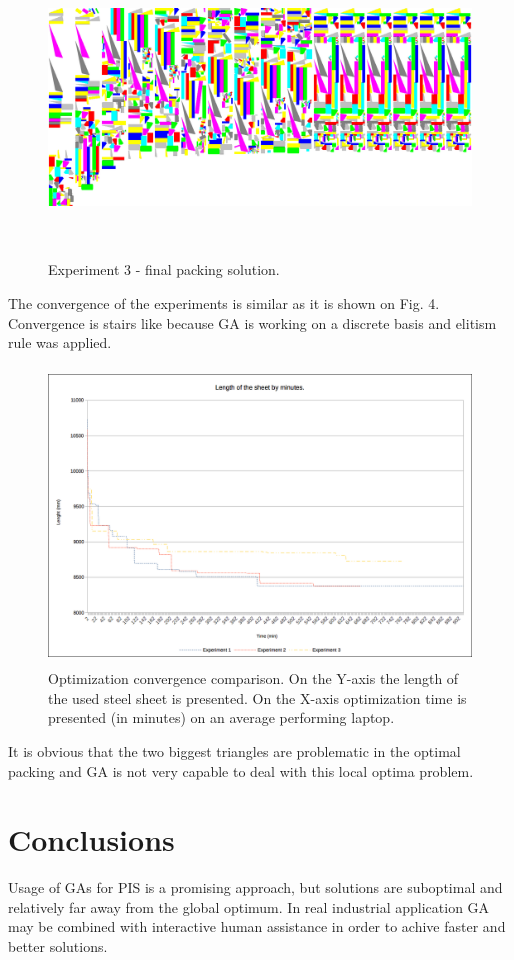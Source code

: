 \documentclass{llncs}
\begin{document}
%
\begin{figure}
	\centering
	\includegraphics[width=12.62cm,height=7.88cm]{fig03.png}
	\caption{Experiment 3 - final packing solution.}
	\label{fig:Graph}
\end{figure}
\FloatBarrier

The convergence of the experiments is similar as it is shown on Fig. 4. Convergence is stairs like because GA is working on a discrete basis and elitism rule was applied.

\begin{figure}
	\centering
	\includegraphics[width=12.62cm,height=7.88cm]{fig05.png}
	\caption{Optimization convergence comparison. On the Y-axis the length of the used steel sheet is presented. On the X-axis optimization time is presented (in minutes) on an average performing laptop.}
	\label{fig:Graph}
\end{figure}
\FloatBarrier
%
It is obvious that the two biggest triangles are problematic in the optimal packing and GA is not very capable to deal with this local optima problem.
%
\section{Conclusions}
%
Usage of GAs for PIS is a promising approach, but solutions are suboptimal and relatively far away from the global optimum. In real industrial application GA may be combined with interactive human assistance in order to achive faster and better solutions. 
%
\end{document}
